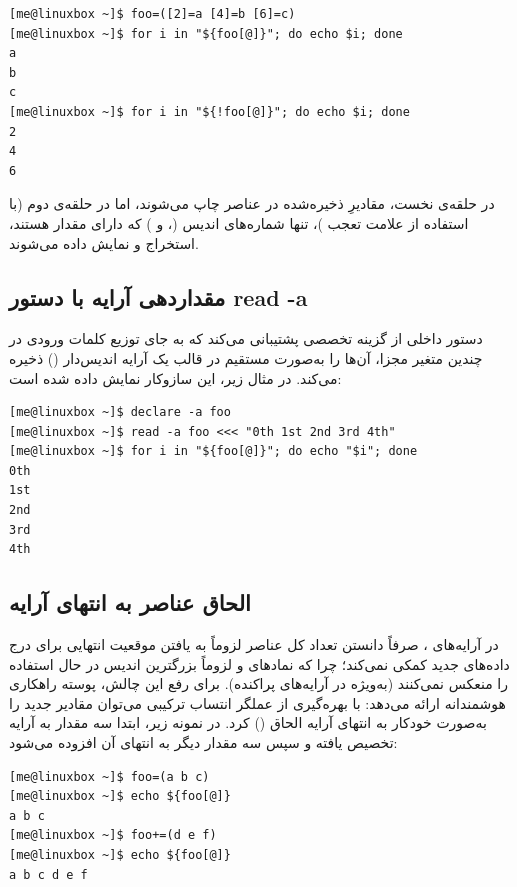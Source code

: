 \begin{latin}
\begin{lstlisting}
[me@linuxbox ~]$ foo=([2]=a [4]=b [6]=c)
[me@linuxbox ~]$ for i in "${foo[@]}"; do echo $i; done
a
b
c
[me@linuxbox ~]$ for i in "${!foo[@]}"; do echo $i; done
2
4
6
\end{lstlisting}
\end{latin}

در حلقه‌ی نخست، مقادیرِ ذخیره‌شده در عناصر چاپ می‌شوند، اما در حلقه‌ی دوم (با استفاده از علامت تعجب \cmd{!})، تنها شماره‌های اندیس (،  و ) که دارای مقدار هستند، استخراج و نمایش داده می‌شوند.

\subsection{مقداردهی آرایه با دستور read -a}

دستور داخلی  از گزینه تخصصی  پشتیبانی می‌کند که به جای توزیع کلمات ورودی در چندین متغیر مجزا، آن‌ها را به‌صورت مستقیم در قالب یک آرایه اندیس‌دار () ذخیره می‌کند. در مثال زیر، این سازوکار نمایش داده شده است:

\begin{latin}
\begin{lstlisting}
[me@linuxbox ~]$ declare -a foo
[me@linuxbox ~]$ read -a foo <<< "0th 1st 2nd 3rd 4th"
[me@linuxbox ~]$ for i in "${foo[@]}"; do echo "$i"; done
0th
1st
2nd
3rd
4th
\end{lstlisting}
\end{latin}

\subsection{الحاق عناصر به انتهای آرایه}

در آرایه‌های ، صرفاً دانستن تعداد کل عناصر لزوماً به یافتن موقعیت انتهایی برای درج داده‌های جدید کمکی نمی‌کند؛ چرا که نمادهای \cmd{*} و  لزوماً بزرگترین اندیس در حال استفاده را منعکس نمی‌کنند (به‌ویژه در آرایه‌های پراکنده). برای رفع این چالش، پوسته راهکاری هوشمندانه ارائه می‌دهد: با بهره‌گیری از عملگر انتساب ترکیبی \cmd{+=} می‌توان مقادیر جدید را به‌صورت خودکار به انتهای آرایه الحاق () کرد. در نمونه زیر، ابتدا سه مقدار به آرایه  تخصیص یافته و سپس سه مقدار دیگر به انتهای آن افزوده می‌شود:

\begin{latin}
\begin{lstlisting}
[me@linuxbox ~]$ foo=(a b c)
[me@linuxbox ~]$ echo ${foo[@]}
a b c
[me@linuxbox ~]$ foo+=(d e f)
[me@linuxbox ~]$ echo ${foo[@]}
a b c d e f
\end{lstlisting}
\end{latin}

